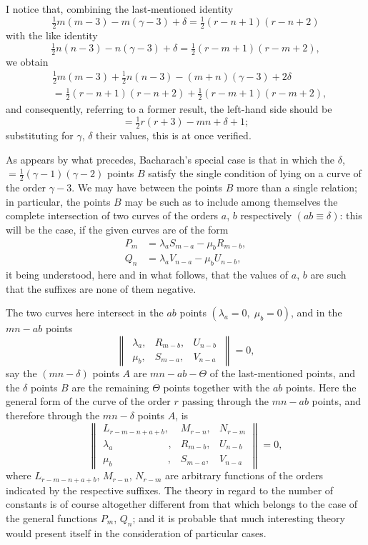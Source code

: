 \documentclass[12pt,a4paper]{article}
\theoremstyle{definition}
\begin{document}
I notice that, combining the last-mentioned identity
\[
\tfrac12 m(m-3) - m(\gamma-3) + \delta = \tfrac12(r-n+1)(r-n+2)
\]
with the like identity
\[
\tfrac12 n(n-3) - n(\gamma-3) + \delta = \tfrac12(r-m+1)(r-m+2),
\]
we obtain
\begin{align*}
&\tfrac12 m(m-3) + \tfrac12 n(n-3) - (m+n)(\gamma-3) + 2\delta\\
&= \tfrac12(r-n+1)(r-n+2) + \tfrac12(r-m+1)(r-m+2),
\end{align*}
and consequently, referring to a former result, the left-hand side should be
\[
= \tfrac12 r(r+3) - mn + \delta + 1;
\]
substituting for $\gamma$, $\delta$ their values, this is at once verified.

As appears by what precedes, Bacharach's special case is that in which the
$\delta$, $= \tfrac12(\gamma-1)(\gamma-2)$ points $B$ satisfy the single condition of lying on a curve of the
order $\gamma-3$. We may have between the points $B$ more than a single relation; in
particular, the points $B$ may be such as to include among themselves the complete
intersection of two curves of the orders $a$, $b$ respectively $(ab \equiv \delta)$: this will be the
case, if the given curves are of the form
\begin{align*}
P_m &= \lambda_a S_{m-a} - \mu_b R_{m-b},\\
Q_n &= \lambda_a V_{n-a} - \mu_b U_{n-b},
\end{align*}
it being understood, here and in what follows, that the values of $a$, $b$ are such that
the suffixes are none of them negative.

The two curves here intersect in the $ab$ points $(\lambda_a = 0,\; \mu_b = 0)$, and in the
$mn - ab$ points
\[
\begin{Vmatrix}
\,\lambda_a, & R_{m-b}, & U_{n-b}\, \\
\,\mu_b, & S_{m-a}, & V_{n-a}\,
\end{Vmatrix}
= 0,
\]
say the $(mn - \delta)$ points $A$ are $mn - ab - \Theta$ of the last-mentioned points, and the $\delta$
points $B$ are the remaining $\Theta$ points together with the $ab$ points. Here the general
form of the curve of the order $r$ passing through the $mn - ab$ points, and therefore
through the $mn - \delta$ points $A$, is
\[
\begin{Vmatrix}
L_{r-m-n+a+b}, & M_{r-n}, & N_{r-m} \\
\lambda_a\phantom{_{r-m-n+a+b}}, & R_{m-b}, & U_{n-b} \\
\mu_b\phantom{_{r-m-n+a+b}}, & S_{m-a}, & V_{n-a}
\end{Vmatrix}
= 0,
\]
where $L_{r-m-n+a+b}$, $M_{r-n}$, $N_{r-m}$ are arbitrary functions of the orders indicated by
the respective suffixes. The theory in regard to the number of constants is of course
altogether different from that which belongs to the case of the general functions
$P_m$, $Q_n$; and it is probable that much interesting theory would present itself in the
consideration of particular cases.
\end{document}
